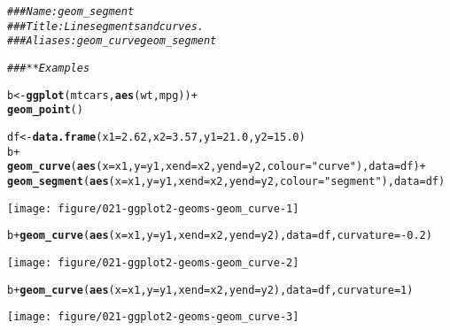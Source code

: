 \documentclass[a4paper,titlepage]{tufte-handout}\usepackage[]{graphicx}\usepackage[]{color}
\makeatletter
\def\maxwidth{ %
  \ifdim\Gin@nat@width>\linewidth
    \linewidth
  \else
    \Gin@nat@width
  \fi
}
\newcommand{\hlnum}[1]{\textcolor[rgb]{0.686,0.059,0.569}{#1}}%
\newcommand{\hlstr}[1]{\textcolor[rgb]{0.192,0.494,0.8}{#1}}%
\newcommand{\hlcom}[1]{\textcolor[rgb]{0.678,0.584,0.686}{\textit{#1}}}%
\newcommand{\hlopt}[1]{\textcolor[rgb]{0,0,0}{#1}}%
\newcommand{\hlstd}[1]{\textcolor[rgb]{0.345,0.345,0.345}{#1}}%
\newcommand{\hlkwb}[1]{\textcolor[rgb]{0.69,0.353,0.396}{#1}}%
\newcommand{\hlkwc}[1]{\textcolor[rgb]{0.333,0.667,0.333}{#1}}%
\newcommand{\hlkwd}[1]{\textcolor[rgb]{0.737,0.353,0.396}{\textbf{#1}}}%
\newenvironment{kframe}{%
 \def\at@end@of@kframe{}%
 \ifinner\ifhmode%
  \def\at@end@of@kframe{\end{minipage}}%
  \begin{minipage}{\columnwidth}%
 \fi\fi%
 \def\FrameCommand##1{\hskip\@totalleftmargin \hskip-\fboxsep
 \colorbox{shadecolor}{##1}\hskip-\fboxsep
     \hskip-\linewidth \hskip-\@totalleftmargin \hskip\columnwidth}%
 \MakeFramed {\advance\hsize-\width
   \@totalleftmargin\z@ \linewidth\hsize
   \@setminipage}}%
 {\par\unskip\endMakeFramed%
 \at@end@of@kframe}
\newenvironment{knitrout}{}{} %
\makeatother
\begin{document}
\begin{knitrout}
\color{fgcolor}\begin{kframe}
\begin{alltt}
\hlcom{### Name: geom_segment}
\hlcom{### Title: Line segments and curves.}
\hlcom{### Aliases: geom_curve geom_segment}

\hlcom{### ** Examples}

\hlstd{b} \hlkwb{<-} \hlkwd{ggplot}\hlstd{(mtcars,} \hlkwd{aes}\hlstd{(wt, mpg))} \hlopt{+}
  \hlkwd{geom_point}\hlstd{()}

\hlstd{df} \hlkwb{<-} \hlkwd{data.frame}\hlstd{(}\hlkwc{x1} \hlstd{=} \hlnum{2.62}\hlstd{,} \hlkwc{x2} \hlstd{=} \hlnum{3.57}\hlstd{,} \hlkwc{y1} \hlstd{=} \hlnum{21.0}\hlstd{,} \hlkwc{y2} \hlstd{=} \hlnum{15.0}\hlstd{)}
\hlstd{b} \hlopt{+}
 \hlkwd{geom_curve}\hlstd{(}\hlkwd{aes}\hlstd{(}\hlkwc{x} \hlstd{= x1,} \hlkwc{y} \hlstd{= y1,} \hlkwc{xend} \hlstd{= x2,} \hlkwc{yend} \hlstd{= y2,} \hlkwc{colour} \hlstd{=} \hlstr{"curve"}\hlstd{),} \hlkwc{data} \hlstd{= df)} \hlopt{+}
 \hlkwd{geom_segment}\hlstd{(}\hlkwd{aes}\hlstd{(}\hlkwc{x} \hlstd{= x1,} \hlkwc{y} \hlstd{= y1,} \hlkwc{xend} \hlstd{= x2,} \hlkwc{yend} \hlstd{= y2,} \hlkwc{colour} \hlstd{=} \hlstr{"segment"}\hlstd{),} \hlkwc{data} \hlstd{= df)}
\end{alltt}
\end{kframe}
\texttt{[image: figure/021-ggplot2-geoms-geom\_curve-1]} 
\begin{kframe}\begin{alltt}
\hlstd{b} \hlopt{+} \hlkwd{geom_curve}\hlstd{(}\hlkwd{aes}\hlstd{(}\hlkwc{x} \hlstd{= x1,} \hlkwc{y} \hlstd{= y1,} \hlkwc{xend} \hlstd{= x2,} \hlkwc{yend} \hlstd{= y2),} \hlkwc{data} \hlstd{= df,} \hlkwc{curvature} \hlstd{=} \hlopt{-}\hlnum{0.2}\hlstd{)}
\end{alltt}
\end{kframe}
\texttt{[image: figure/021-ggplot2-geoms-geom\_curve-2]} 
\begin{kframe}\begin{alltt}
\hlstd{b} \hlopt{+} \hlkwd{geom_curve}\hlstd{(}\hlkwd{aes}\hlstd{(}\hlkwc{x} \hlstd{= x1,} \hlkwc{y} \hlstd{= y1,} \hlkwc{xend} \hlstd{= x2,} \hlkwc{yend} \hlstd{= y2),} \hlkwc{data} \hlstd{= df,} \hlkwc{curvature} \hlstd{=} \hlnum{1}\hlstd{)}
\end{alltt}
\end{kframe}
\texttt{[image: figure/021-ggplot2-geoms-geom\_curve-3]} 
\begin{kframe}\begin{alltt}

\end{alltt}
\end{kframe}
\end{knitrout}
\end{document}
